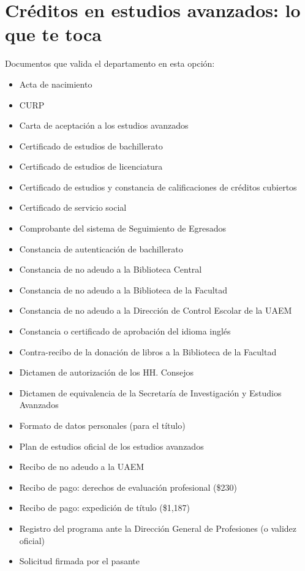 \section{Créditos en estudios avanzados: lo que te toca}
Documentos que valida el departamento en esta opción:
\begin{itemize}
  \item Acta de nacimiento
  \item CURP
  \item Carta de aceptación a los estudios avanzados
  \item Certificado de estudios de bachillerato
  \item Certificado de estudios de licenciatura
  \item Certificado de estudios y constancia de calificaciones de créditos cubiertos
  \item Certificado de servicio social
  \item Comprobante del sistema de Seguimiento de Egresados
  \item Constancia de autenticación de bachillerato
  \item Constancia de no adeudo a la Biblioteca Central
  \item Constancia de no adeudo a la Biblioteca de la Facultad
  \item Constancia de no adeudo a la Dirección de Control Escolar de la UAEM
  \item Constancia o certificado de aprobación del idioma inglés
  \item Contra-recibo de la donación de libros a la Biblioteca de la Facultad
  \item Dictamen de autorización de los HH. Consejos
  \item Dictamen de equivalencia de la Secretaría de Investigación y Estudios Avanzados
  \item Formato de datos personales (para el título)
  \item Plan de estudios oficial de los estudios avanzados
  \item Recibo de no adeudo a la UAEM
  \item Recibo de pago: derechos de evaluación profesional (\$230)
  \item Recibo de pago: expedición de título (\$1,187)
  \item Registro del programa ante la Dirección General de Profesiones (o validez oficial)
  \item Solicitud firmada por el pasante
\end{itemize}
